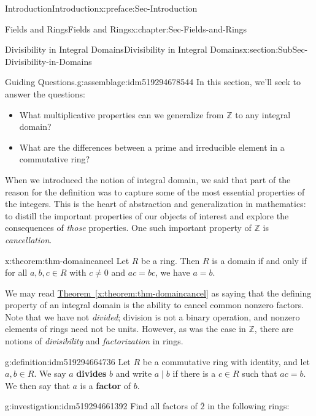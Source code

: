 \documentclass[oneside,10pt,]{book}
\newcommand{\xreffont}{\relax}
\newcommand{\terminology}[1]{\textbf{#1}}
\numberwithin{equation}{section}
\def\Z{{\mathbb Z}}
\begin{document}
\begin{preface}{Introduction}{}{Introduction}{}{}{x:preface:Sec-Introduction}
\begin{chapterptx}{Fields and Rings}{}{Fields and Rings}{}{}{x:chapter:Sec-Fields-and-Rings}
%
\begin{sectionptx}{Divisibility in Integral Domains}{}{Divisibility in Integral Domains}{}{}{x:section:SubSec-Divisibility-in-Domains}
\begin{assemblage}{Guiding Questions.}{g:assemblage:idm519294678544}%
In this section, we'll seek to answer the questions: %
\begin{itemize}[label=\textbullet]
\item{}What multiplicative properties can we generalize from \(\Z\) to any integral domain?%
\item{}What are the differences between a prime and irreducible element in a commutative ring?%
\end{itemize}
%
\end{assemblage}
When we introduced the notion of integral domain, we said that part of the reason for the definition was to capture some of the most essential properties of the integers. This is the heart of abstraction and generalization in mathematics: to distill the important properties of our objects of interest and explore the consequences of \emph{those} properties. One such important property of \(\Z\) is \emph{cancellation}.%
\begin{theorem}{}{}{x:theorem:thm-domaincancel}%
Let \(R\) be a ring. Then \(R\) is a domain if and only if for all \(a,b,c\in R\) with \(c\ne 0\) and \(ac = bc\), we have \(a = b\).%
\end{theorem}
We may read \hyperref[x:theorem:thm-domaincancel]{Theorem~{\xreffont\ref{x:theorem:thm-domaincancel}}} as saying that the defining property of an integral domain is the ability to cancel common nonzero factors. Note that we have not \emph{divided}; division is not a binary operation, and nonzero elements of rings need not be units. However, as was the case in \(\Z\), there are notions of \emph{divisibility} and \emph{factorization} in rings.%
\begin{definition}{}{g:definition:idm519294664736}%
%
%
Let \(R\) be a commutative ring with identity, and let \(a,b\in R\). We say \(a\) \terminology{divides} \(b\) and write \(a\mid b\) if there is a \(c\in R\) such that \(ac = b\). We then say that \(a\) is a \terminology{factor} of \(b\).%
\end{definition}
\begin{investigation}{}{g:investigation:idm519294661392}%
Find all factors of \(\overline{2}\) in the following rings:%
%
\begin{enumerate}

\end{enumerate}
\end{investigation}
\end{sectionptx}
\end{chapterptx}
\end{preface}
\end{document}
